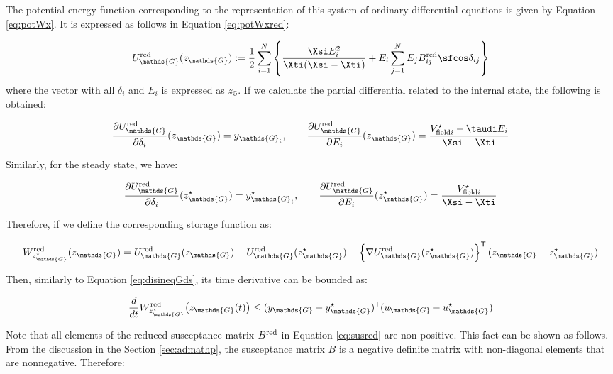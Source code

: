 \documentclass[graybox, envcountchap]{svmult}
\begin{document}
The potential energy function corresponding to the representation of this system
of ordinary differential equations is given by Equation \ref{eq:potWx}. It is
expressed as follows in Equation \ref{eq:potWxred}:

\begin{equation}\label{eq:potWxred}
  U_{\mathds{G}}^{\rm red} (z_{\mathds{G}})  := 
  \frac{1}{2} 
  \sum_{i=1}^N
  \left\{
  \frac{ \Xsi E_i^2 }{ \Xti ( \Xsi - \Xti )}  
  + E_i \sum_{j=1}^{N}
  E_j 
  B_{ij}^{\rm red}
  \sfcos \delta_{ij}
  \right\}
\end{equation}
where the vector with all $\delta_i$ and $E_i$ is expressed as $z_{\mathds{G}}$.
If we calculate the partial differential related to the internal state, the
following is obtained:

\begin{equation*}
  \frac{\partial U_{\mathds{G}}^{\rm red} }{\partial \delta_i}(z_{\mathds{G}})  = y_{\mathds{G}_i}
  ,\qquad
  \frac{\partial U_{\mathds{G}}^{\rm red} }{\partial E_i} (z_{\mathds{G}}) = 
  \frac{V_{{\rm field}i}^{\star} - \taudi\dot{E}_i  }{ \Xsi - \Xti }
\end{equation*}

Similarly, for the steady state, we have:

\begin{equation*}
\frac{\partial U_{\mathds{G}}^{\rm red} }{\partial \delta_i} ( z^{\star}_{\mathds{G}} )
= y_{\mathds{G}_i}^{\star}
,\qquad
\frac{\partial U_{\mathds{G}}^{\rm red} }{\partial E_i} ( z^{\star}_{\mathds{G}} ) = 
\frac{V_{{\rm field}i}^{\star}  }{ \Xsi - \Xti }
\end{equation*}

Therefore, if we define the corresponding storage function as:

\[ 
  W_{z^{\star}_{\mathds{G}}}^{\rm red} (z_{\mathds{G}}) = U_{\mathds{G}}^{\rm red} (z_{\mathds{G}}) 
  - U_{\mathds{G}}^{\rm red} (z^{\star}_{\mathds{G}}) 
  - \left\{ \nabla U_{\mathds{G}}^{\rm red}(z^{\star}_{\mathds{G}}) \right\}^{\sf T}
  (z_{\mathds{G}}-z^{\star}_{\mathds{G}})
\]

Then, similarly to Equation \ref{eq:disineqGds}, its time derivative can be
bounded as:

\[
  \frac{d}{dt}W_{z^{\star}_{\mathds{G}}}^{\rm red} \bigl(z_{\mathds{G}}(t) \bigr)
  \leq 
  (y_{\mathds{G}}-y_{\mathds{G}}^{\star})^{\sf T} (u_{\mathds{G}}- u_{\mathds{G}}^{\star})
\]

Note that all elements of the reduced susceptance matrix $B^{\rm red}$ in
Equation \ref{eq:susred} are non-positive. This fact can be shown as follows.
From the discussion in the Section \ref{sec:admathp}, the susceptance matrix $B$
is a negative definite matrix with non-diagonal elements that are nonnegative.
Therefore:
\end{document}
